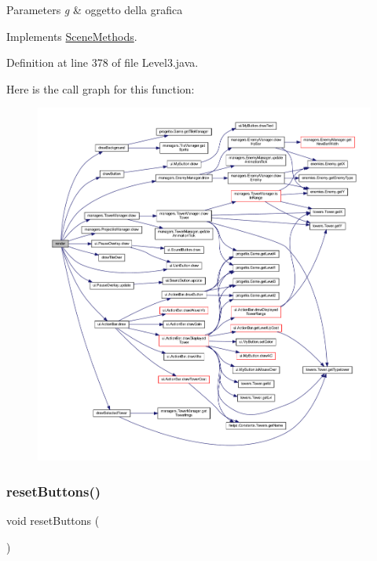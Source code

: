 \begin{DoxyParams}{Parameters}
{\em g} & oggetto della grafica \\
\hline
\end{DoxyParams}


Implements \hyperlink{interfacescenes_1_1_scene_methods_a203b6ad9d5e4d54dd1152986eec4dedc}{Scene\+Methods}.



Definition at line 378 of file Level3.\+java.

Here is the call graph for this function\+:\nopagebreak
\begin{figure}[H]
\begin{center}
\leavevmode
\includegraphics[width=350pt]{classscenes_1_1_level3_a203b6ad9d5e4d54dd1152986eec4dedc_cgraph}
\end{center}
\end{figure}
\mbox{\label{classscenes_1_1_level3_a548cf4795e9d559d0c0cce0bb57a5251}} 
\subsubsection{\texorpdfstring{reset\+Buttons()}{resetButtons()}}
{\footnotesize\ttfamily void reset\+Buttons (\begin{DoxyParamCaption}{ }\end{DoxyParamCaption})\hspace{0.3cm}{\ttfamily [private]}}




